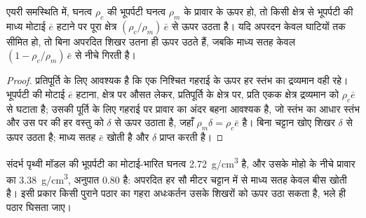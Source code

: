 \begin{proposition}\label{prop:b3:quantitative-geomorphology:rebound}
एयरी समस्थिति में, घनत्व $\rho_c$ की भूपर्पटी घनत्व
$\rho_m$ के प्रावार के ऊपर हो, तो किसी क्षेत्र से भूपर्पटी की माध्य मोटाई $\bar e$ हटाने पर
पूरा क्षेत्र $(\rho_c/\rho_m)\,\bar e$ से ऊपर उठता है। यदि अपरदन केवल घाटियों तक सीमित हो,
तो बिना अपरदित शिखर उतना ही ऊपर उठते हैं, जबकि माध्य
सतह केवल $(1 - \rho_c/\rho_m)\,\bar e$ से नीचे गिरती है।
\end{proposition}

\begin{proof}
प्रतिपूर्ति के लिए आवश्यक है कि एक निश्चित गहराई के ऊपर हर स्तंभ का द्रव्यमान
वही रहे। भूपर्पटी की मोटाई $\bar e$ हटाना, क्षेत्र पर औसत लेकर,
प्रतिपूर्ति के क्षेत्र पर, प्रति एकक क्षेत्र द्रव्यमान को $\rho_c \bar e$ से घटाता है;
उसकी पूर्ति के लिए गहराई पर प्रावार का अंदर बहना आवश्यक है, जो स्तंभ का आधार
स्तंभ और उस पर की हर वस्तु को $\delta$ से ऊपर उठाता है, जहाँ $\rho_m \delta = \rho_c \bar
e$ है। बिना चट्टान खोए शिखर $\delta$ से ऊपर उठता है; माध्य सतह
$\bar e$ खोती है और $\delta$ प्राप्त करती है।
\end{proof}

संदर्भ पृथ्वी मॉडल की भूपर्पटी का मोटाई-भारित घनत्व
\qty{2.72}{g/cm^3} है, और उसके मोहो के नीचे प्रावार का \qty{3.38}{g/cm^3},
अनुपात 0.80 है: अपरदित हर सौ मीटर चट्टान में से माध्य सतह
केवल बीस खोती है। इसी प्रकार किसी पुराने पठार का गहरा अधःकर्तन उसके
शिखरों को ऊपर उठा सकता है, भले ही पठार घिसता जाए।

